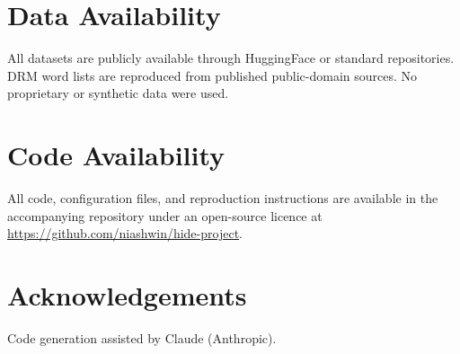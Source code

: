 \documentclass[11pt]{article}
\begin{document}
\section*{Data Availability}

All datasets are publicly available through HuggingFace or standard repositories. DRM word lists are reproduced from published public-domain sources\cite{roediger1995}. No proprietary or synthetic data were used.

\section*{Code Availability}

All code, configuration files, and reproduction instructions are available in the accompanying repository under an open-source licence at \url{https://github.com/niashwin/hide-project}.

\section*{Acknowledgements}

Code generation assisted by Claude (Anthropic).

\end{document}
